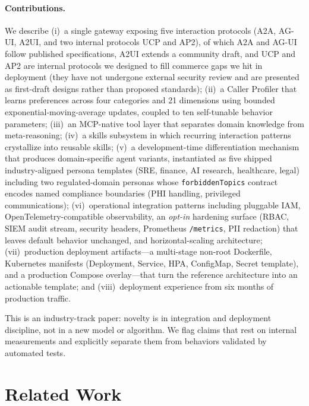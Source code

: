 \documentclass[11pt]{article}
\begin{document}
\paragraph{Contributions.} We describe (i)~a single gateway exposing five interaction protocols (A2A, AG-UI, A2UI, and two internal protocols UCP and AP2), of which A2A and AG-UI follow published specifications, A2UI extends a community draft, and UCP and AP2 are internal protocols we designed to fill commerce gaps we hit in deployment (they have not undergone external security review and are presented as first-draft designs rather than proposed standards); (ii)~a Caller Profiler that learns preferences across four categories and 21 dimensions using bounded exponential-moving-average updates, coupled to ten self-tunable behavior parameters; (iii)~an MCP-native tool layer that separates domain knowledge from meta-reasoning; (iv)~a skills subsystem in which recurring interaction patterns crystallize into reusable skills; (v)~a development-time differentiation mechanism that produces domain-specific agent variants, instantiated as five shipped industry-aligned persona templates (SRE, finance, AI research, healthcare, legal) including two regulated-domain personas whose \texttt{forbiddenTopics} contract encodes named compliance boundaries (PHI handling, privileged communications); (vi)~operational integration patterns including pluggable IAM, OpenTelemetry-compatible observability, an \emph{opt-in} hardening surface (RBAC, SIEM audit stream, security headers, Prometheus \texttt{/metrics}, PII redaction) that leaves default behavior unchanged, and horizontal-scaling architecture; (vii)~production deployment artifacts---a multi-stage non-root Dockerfile, Kubernetes manifests (Deployment, Service, HPA, ConfigMap, Secret template), and a production Compose overlay---that turn the reference architecture into an actionable template; and (viii)~deployment experience from six months of production traffic.

This is an industry-track paper: novelty is in integration and deployment discipline, not in a new model or algorithm. We flag claims that rest on internal measurements and explicitly separate them from behaviors validated by automated tests.

\section{Related Work}
\label{sec:related}
\end{document}
